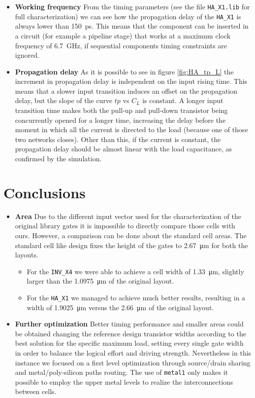 \documentclass[a4paper]{article}
\newcommand{\inv}{\texttt{INV\_X4}\xspace}
\newcommand{\ha}{\texttt{HA\_X1}\xspace}
\begin{document}
\begin{itemize}
	\item \textbf{Working frequency} From the timing parameters (see the file \texttt{HA\_X1.lib} for full characterization) we can see how the propagation delay of the \ha is always lower than \SI{150}{\pico\second}. This means that the component can be inserted in a circuit (for example a pipeline stage) that works at a maximum clock frequency of \SI{6.7}{\giga\hertz}, if sequential components timing constraints are ignored.
	\item \textbf{Propagation delay} As it is possible to see in figure \ref{fig:HA_tp_L} the increment in propagation delay is independent on the input rising time. This means that a slower input transition induces an offset on the propagation delay, but the slope of the curve $tp$ vs $C_L$ is constant. A longer input transition time makes both the pull-up and pull-down transistor being concurrently opened for a longer time, increasing the delay before the moment in which all the current is directed to the load (because one of those two networks closes). Other than this, if the current is constant, the propagation delay should be almost linear with the load capacitance, as confirmed by the simulation.
\end{itemize}

\section{Conclusions}
\begin{itemize}
	\item \textbf{Area} Due to the different input vector used for the characterization of the original library gates it is impossible to directly compare those cells with ours. However, a comparison can be done about the standard cell areas. The standard cell like design fixes the height of the gates to \SI{2.67}{\micro\meter} for both the layouts.
	\begin{itemize}
		\item For the \inv we were able to achieve a cell width of \SI{1.33}{\micro\meter}, slightly larger than the \SI{1.0975}{\micro\meter} of the original layout.

		\item For the \ha we managed to achieve much better results, resulting in a width of \SI{1.9025}{\micro\meter} versus the \SI{2.66}{\micro\meter} of the original layout.
	\end{itemize}

	\item \textbf{Further optimization} Better timing performance and smaller areas could be obtained changing the reference design transistor widths according to the best solution for the specific maximum load, setting every single gate width in order to balance the logical effort and driving strength. Nevertheless in this instance we focused on a first level optimization through source/drain sharing and metal/poly-silicon paths routing. The use of \texttt{metal1} only makes it possible to employ the upper metal levels to realize the interconnections between cells.
\end{itemize}
\end{document}
